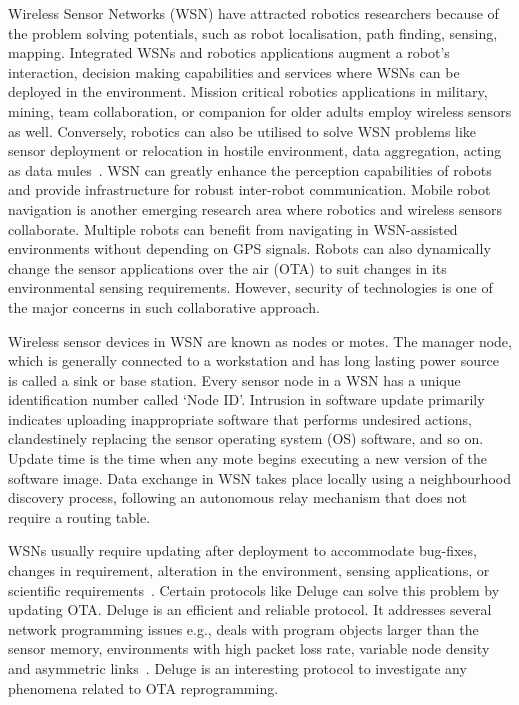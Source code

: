 \documentclass[conference,final]{IEEEtran}
\begin{document}
Wireless Sensor Networks (WSN) have attracted robotics
researchers because of the problem solving potentials, such as
robot localisation, path finding, sensing, mapping. Integrated
WSNs and robotics applications augment a robot's interaction,
decision making capabilities and services where WSNs can be
deployed in the environment. Mission critical robotics applications in military, mining, team collaboration, or companion
for older adults employ wireless sensors as well. Conversely,
robotics can also be utilised to solve WSN problems like
sensor deployment or relocation in hostile environment, data aggregation, acting as data mules~\cite{Shue13}.
WSN can greatly enhance
the perception capabilities of robots and provide infrastructure
for robust inter-robot communication. Mobile robot navigation is another emerging research area where robotics and
wireless sensors collaborate. Multiple robots can benefit from
navigating in WSN-assisted environments without depending
on GPS signals. Robots can also dynamically change the
sensor applications over the air (OTA) to suit changes
in its environmental sensing requirements. However, security of
technologies is one of the major concerns in such collaborative
approach.

Wireless sensor devices in WSN are known as nodes or
motes. The manager node, which is generally connected to
a workstation and has long lasting power source is called a sink
or base station. Every sensor node in a WSN has a unique
identification number called `Node ID'. Intrusion in software
update primarily indicates uploading inappropriate software
that performs undesired actions, clandestinely replacing the
sensor operating system (OS) software, and so on. Update time
is the time when any mote begins executing a new version
of the software image. Data exchange in WSN takes place
locally using a neighbourhood discovery process, following
an autonomous relay mechanism that does not require a routing table.

WSNs usually require updating after deployment to accommodate bug-fixes, changes in requirement, alteration in
the environment, sensing applications, or scientific requirements~\cite{ISI:000253439700120}.
Certain protocols like Deluge can solve this problem
by updating OTA. Deluge is an efficient and reliable protocol.
It addresses several network programming issues e.g., deals
with program objects larger than the sensor memory, environments with high packet loss rate, variable node density
and asymmetric links~\cite{1031506}.
Deluge is an interesting protocol
to investigate any phenomena related to OTA reprogramming.
\end{document}
